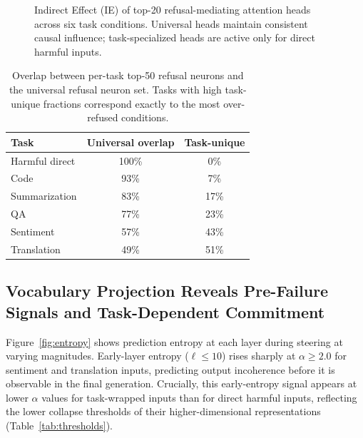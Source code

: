 \documentclass[11pt]{article}
\begin{document}
\begin{figure}[t]
  \centering
  \caption{Indirect Effect (IE) of top-20 refusal-mediating attention heads across six task conditions. Universal heads maintain consistent causal influence; task-specialized heads are active only for direct harmful inputs.}
  \label{fig:heads}
\end{figure}

\begin{table}[h]
\centering
\small
\setlength{\tabcolsep}{5pt}
\begin{tabular}{lcc}
\toprule
Task & Universal overlap & Task-unique \\
\midrule
Harmful direct & 100\% & 0\% \\
Code           & 93\%  & 7\% \\
Summarization  & 83\%  & 17\% \\
QA             & 77\%  & 23\% \\
Sentiment      & 57\%  & 43\% \\
Translation    & 49\%  & 51\% \\
\bottomrule
\end{tabular}
\caption{Overlap between per-task top-50 refusal neurons and the universal refusal neuron set. Tasks with high task-unique fractions correspond exactly to the most over-refused conditions.}
\label{tab:neurons}
\end{table}

\subsection{Vocabulary Projection Reveals Pre-Failure Signals and Task-Dependent Commitment}

Figure~\ref{fig:entropy} shows prediction entropy at each layer during steering at varying magnitudes. Early-layer entropy ($\ell \leq 10$) rises sharply at $\alpha \geq 2.0$ for sentiment and translation inputs, predicting output incoherence before it is observable in the final generation. Crucially, this early-entropy signal appears at lower $\alpha$ values for task-wrapped inputs than for direct harmful inputs, reflecting the lower collapse thresholds of their higher-dimensional representations (Table~\ref{tab:thresholds}).
\end{document}
